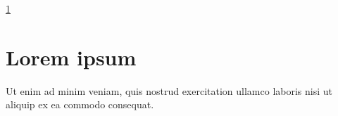 \ref{somelabel}
\relax

\section{Lorem ipsum}
\label{somelabel}

Ut enim ad minim veniam, quis nostrud exercitation ullamco laboris
nisi ut aliquip ex ea commodo consequat.
